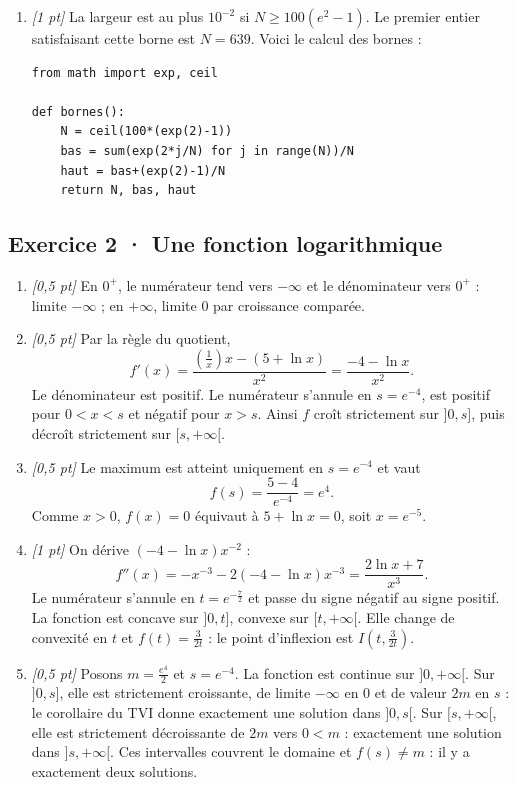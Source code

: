 \begin{enumerate}

\item \textit{[1 pt]} La largeur est au plus $10^{-2}$ si $N\ge100(e^{2}-1)$. Le premier entier satisfaisant cette borne est $N=639$. Voici le calcul des bornes :
\begin{lstlisting}
from math import exp, ceil

def bornes():
    N = ceil(100*(exp(2)-1))
    bas = sum(exp(2*j/N) for j in range(N))/N
    haut = bas+(exp(2)-1)/N
    return N, bas, haut
\end{lstlisting}


\end{enumerate}

\subsection*{Exercice 2 · Une fonction logarithmique}\begin{enumerate}

\item \textit{[0{,}5 pt]} En $0^+$, le numérateur tend vers $-\infty$ et le dénominateur vers $0^+$ : limite $-\infty$ ; en $+\infty$, limite $0$ par croissance comparée.

\item \textit{[0{,}5 pt]} Par la règle du quotient,
\[f'(x)=\frac{(\frac{1}{x})x-(5+\ln x)}{x^2}=\frac{-4-\ln x}{x^2}.\]
Le dénominateur est positif. Le numérateur s'annule en $s=e^{-4}$, est positif pour $0<x<s$ et négatif pour $x>s$. Ainsi $f$ croît strictement sur $]0,s]$, puis décroît strictement sur $[s,+\infty[$.

\item \textit{[0{,}5 pt]} Le maximum est atteint uniquement en $s=e^{-4}$ et vaut
\[f(s)=\frac{5- 4}{e^{-4}}=e^{4}.\]
Comme $x>0$, $f(x)=0$ équivaut à $5+\ln x=0$, soit $x=e^{-5}$.

\item \textit{[1 pt]} On dérive $(-4-\ln x)x^{-2}$ :
\[f''(x)=-x^{-3}-2(-4-\ln x)x^{-3}=\frac{2\ln x+7}{x^3}.\]
Le numérateur s'annule en $t=e^{-\frac{7}{2}}$ et passe du signe négatif au signe positif. La fonction est concave sur $]0,t]$, convexe sur $[t,+\infty[$. Elle change de convexité en $t$ et $f(t)=\frac{3}{2t}$ : le point d'inflexion est $I(t,\frac{3}{2t})$.

\item \textit{[0{,}5 pt]} Posons $m=\frac{e^{4}}{2}$ et $s=e^{-4}$. La fonction est continue sur $]0,+\infty[$. Sur $]0,s]$, elle est strictement croissante, de limite $-\infty$ en $0$ et de valeur $2m$ en $s$ : le corollaire du TVI donne exactement une solution dans $]0,s[$. Sur $[s,+\infty[$, elle est strictement décroissante de $2m$ vers $0<m$ : exactement une solution dans $]s,+\infty[$. Ces intervalles couvrent le domaine et $f(s)\ne m$ : il y a exactement deux solutions.


\end{enumerate}
